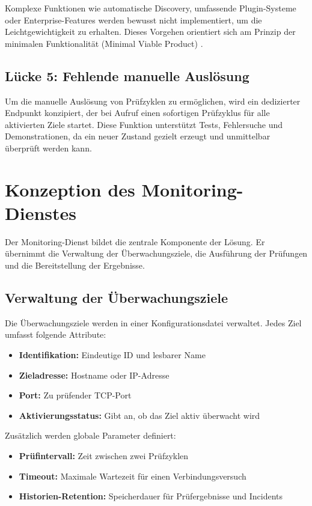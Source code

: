 Komplexe Funktionen wie automatische Discovery, umfassende Plugin-Systeme oder Enterprise-Features werden bewusst nicht implementiert, um die Leichtgewichtigkeit zu erhalten. Dieses Vorgehen orientiert sich am Prinzip der minimalen Funktionalität (Minimal Viable Product) \cite{lean-software-development}.

\subsection{Lücke 5: Fehlende manuelle Auslösung}
\label{subsec:loesung-luecke-5}

Um die manuelle Auslösung von Prüfzyklen zu ermöglichen, wird ein dedizierter Endpunkt konzipiert, der bei Aufruf einen sofortigen Prüfzyklus für alle aktivierten Ziele startet. Diese Funktion unterstützt Tests, Fehlersuche und Demonstrationen, da ein neuer Zustand gezielt erzeugt und unmittelbar überprüft werden kann.

\section{Konzeption des Monitoring-Dienstes}
\label{sec:konzeption-monitoring-dienst}

Der Monitoring-Dienst bildet die zentrale Komponente der Lösung. Er übernimmt die Verwaltung der Überwachungsziele, die Ausführung der Prüfungen und die Bereitstellung der Ergebnisse.

\subsection{Verwaltung der Überwachungsziele}
\label{subsec:verwaltung-ueberwachungsziele}

Die Überwachungsziele werden in einer Konfigurationsdatei verwaltet. Jedes Ziel umfasst folgende Attribute:

\begin{itemize}
    \item \textbf{Identifikation:} Eindeutige ID und lesbarer Name
    \item \textbf{Zieladresse:} Hostname oder IP-Adresse
    \item \textbf{Port:} Zu prüfender TCP-Port
    \item \textbf{Aktivierungsstatus:} Gibt an, ob das Ziel aktiv überwacht wird
\end{itemize}

Zusätzlich werden globale Parameter definiert:

\begin{itemize}
    \item \textbf{Prüfintervall:} Zeit zwischen zwei Prüfzyklen
    \item \textbf{Timeout:} Maximale Wartezeit für einen Verbindungsversuch
    \item \textbf{Historien-Retention:} Speicherdauer für Prüfergebnisse und Incidents
\end{itemize}

